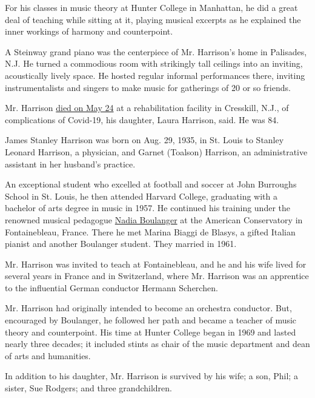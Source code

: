 For his classes in music theory at Hunter College in Manhattan, he did a
great deal of teaching while sitting at it, playing musical excerpts as
he explained the inner workings of harmony and counterpoint.

A Steinway grand piano was the centerpiece of Mr. Harrison's home in
Palisades, N.J. He turned a commodious room with strikingly tall
ceilings into an inviting, acoustically lively space. He hosted regular
informal performances there, inviting instrumentalists and singers to
make music for gatherings of 20 or so friends.

Mr. Harrison
\href{https://www.legacy.com/obituaries/nytimes/obituary.aspx?n=james-harrison\&pid=196277434\&fhid=17032}{died
on May 24} at a rehabilitation facility in Cresskill, N.J., of
complications of Covid-19, his daughter, Laura Harrison, said. He was
84.

James Stanley Harrison was born on Aug. 29, 1935, in St. Louis to
Stanley Leonard Harrison, a physician, and Garnet (Toalson) Harrison, an
administrative assistant in her husband's practice.

An exceptional student who excelled at football and soccer at John
Burroughs School in St. Louis, he then attended Harvard College,
graduating with a bachelor of arts degree in music in 1957. He continued
his training under the renowned musical pedagogue
\href{https://www.nytimes3xbfgragh.onion/1979/10/23/archives/nadia-boulanger-teacher-of-top-composers-dies-onewoman-graduate.html\#:~:text=Nadia\%20Boulanger\%2C\%20the\%20French\%20teacher,in\%20coma\%20for\%20three\%20weeks.}{Nadia
Boulanger} at the American Conservatory in Fontainebleau, France. There
he met Marina Biaggi de Blasys, a gifted Italian pianist and another
Boulanger student. They married in 1961.

Mr. Harrison was invited to teach at Fontainebleau, and he and his wife
lived for several years in France and in Switzerland, where Mr. Harrison
was an apprentice to the influential German conductor Hermann Scherchen.

Mr. Harrison had originally intended to become an orchestra conductor.
But, encouraged by Boulanger, he followed her path and became a teacher
of music theory and counterpoint. His time at Hunter College began in
1969 and lasted nearly three decades; it included stints as chair of the
music department and dean of arts and humanities.

In addition to his daughter, Mr. Harrison is survived by his wife; a
son, Phil; a sister, Sue Rodgers; and three grandchildren.

